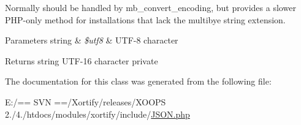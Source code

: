 Normally should be handled by mb\-\_\-convert\-\_\-encoding, but provides a slower P\-H\-P-\/only method for installations that lack the multibye string extension.


\begin{DoxyParams}[1]{Parameters}
string & {\em \$utf8} & U\-T\-F-\/8 character \\
\hline
\end{DoxyParams}
\begin{DoxyReturn}{Returns}
string U\-T\-F-\/16 character  private 
\end{DoxyReturn}


The documentation for this class was generated from the following file\-:\begin{DoxyCompactItemize}
\item 
E\-:/== S\-V\-N ==/\-Xortify/releases/\-X\-O\-O\-P\-S 2./4./htdocs/modules/xortify/include/\hyperlink{include_2json_8php}{J\-S\-O\-N.\-php}\end{DoxyCompactItemize}
